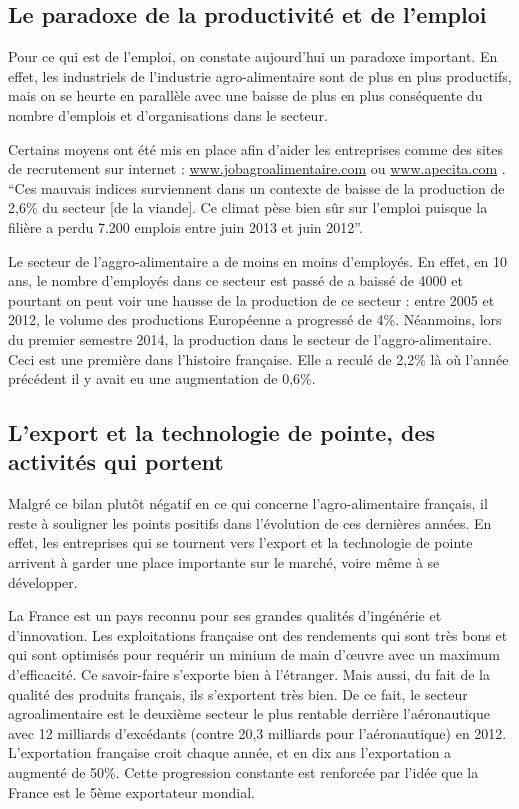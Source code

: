\documentclass[a4paper,12pt]{report}
\begin{document}
		\subsection{Le paradoxe de la productivité et de l'emploi}
			Pour ce qui est de l’emploi, on constate aujourd'hui un paradoxe important. En effet, les industriels de l’industrie agro-alimentaire sont de plus en plus productifs, mais on se heurte en parallèle avec une baisse de plus en plus conséquente du nombre d’emplois et d’organisations dans le secteur.
			
			Certains moyens ont été mis en place afin d’aider les entreprises comme des sites de recrutement sur internet : \url{www.jobagroalimentaire.com} ou \url{www.apecita.com} .  “Ces mauvais indices surviennent dans un contexte de baisse de la production de 2,6\% du secteur [de la viande]. Ce climat pèse bien sûr sur l'emploi puisque la filière a perdu 7.200 emplois entre juin 2013 et juin 2012”\cite{DeficitCommercialViandeAggrave}.
			
			Le secteur de l’aggro-alimentaire a de moins en moins d’employés. En effet, en 10 ans, le nombre d’employés dans ce secteur est passé de a baissé de 4000\cite{IAAHeritageAgricoleBretagne} et pourtant on peut voir une hausse de la production de ce secteur : entre 2005 et 2012, le volume des productions Européenne a progressé de 4\%\cite{HausseModereeVenteProduitsAA2012}. Néanmoins, lors du premier semestre 2014, la production dans le secteur de l’aggro-alimentaire. Ceci est une première dans l’histoire française. Elle a reculé de 2,2\% là où l’année précédent il y avait eu une augmentation de 0,6\%\cite{ReculHistoriqueProductionAAFrance}.
			

		\subsection{L'export et la technologie de pointe, des activités qui portent}
			Malgré ce bilan plutôt négatif en ce qui concerne l’agro-alimentaire français, il reste à souligner les points positifs dans l’évolution de ces dernières années. En effet, les entreprises qui se tournent vers l’export et la technologie de pointe arrivent à garder une place importante sur le marché, voire même à se développer.
			
			La France est un pays reconnu pour ses grandes qualités d’ingénérie et d’innovation. Les exploitations française ont des rendements qui sont très bons et qui sont optimisés pour requérir un minium de main d'œuvre avec un maximum d’efficacité. Ce savoir-faire s’exporte bien à l’étranger. Mais aussi, du fait de la qualité des produits français, ils s’exportent très bien. De ce fait, le secteur agroalimentaire est le deuxième secteur le plus rentable derrière l’aéronautique avec 12 milliards d’excédants (contre 20,3 milliards pour l’aéronautique) en 2012\cite{AAExport2014}. L’exportation française croit chaque année, et en dix ans l’exportation a augmenté de 50\%. Cette progression constante est renforcée par l’idée que la France est le 5ème exportateur mondial.
\end{document}
